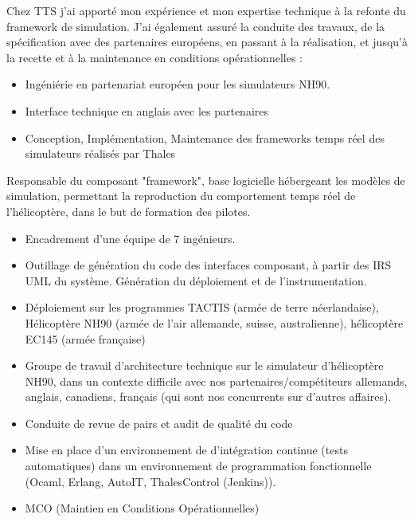 {
Chez TTS j'ai apporté mon expérience et mon expertise technique à la refonte du framework de simulation. J'ai également assuré la conduite des travaux, de la spécification avec des partenaires européens, en passant à la réalisation, et jusqu'à la recette et à la maintenance en conditions opérationnelles :
\begin{itemize}
\item {Ingéniérie en partenariat européen pour les simulateurs NH90.}
\item {Interface technique en anglais avec les partenaires}
\item {Conception, Implémentation, Maintenance des frameworks temps réel des simulateurs réalisés par Thales}
\end{itemize}

Responsable du composant "framework", base logicielle hébergeant les modèles de simulation, permettant la reproduction du comportement temps réel de l'hélicoptère, dans le but de formation des pilotes.
\begin{itemize}
\item{	Encadrement d’une équipe de 7 ingénieurs.}
\item{	Outillage de génération du code des interfaces composant, à partir des IRS UML du système. Génération du déploiement et de l’instrumentation.}
\item{Déploiement sur les programmes TACTIS (armée de terre néerlandaise), Hélicoptère NH90 (armée de l’air allemande, suisse, australienne), hélicoptère EC145 (armée française)}
\item{Groupe de travail d’architecture technique sur le simulateur d’hélicoptère NH90, dans un contexte difficile avec nos partenaires/compétiteurs allemands, anglais, canadiens, français (qui sont nos concurrents sur d’autres affaires).}
\item {Conduite de revue de pairs et audit de qualité du code}
\item {Mise en place d’un environnement de d’intégration continue (tests automatiques) dans un environnement de programmation fonctionnelle (Ocaml, Erlang, AutoIT, ThalesControl (Jenkins)).}
\item {MCO (Maintien en Conditions Opérationnelles)}
\end{itemize}
}

